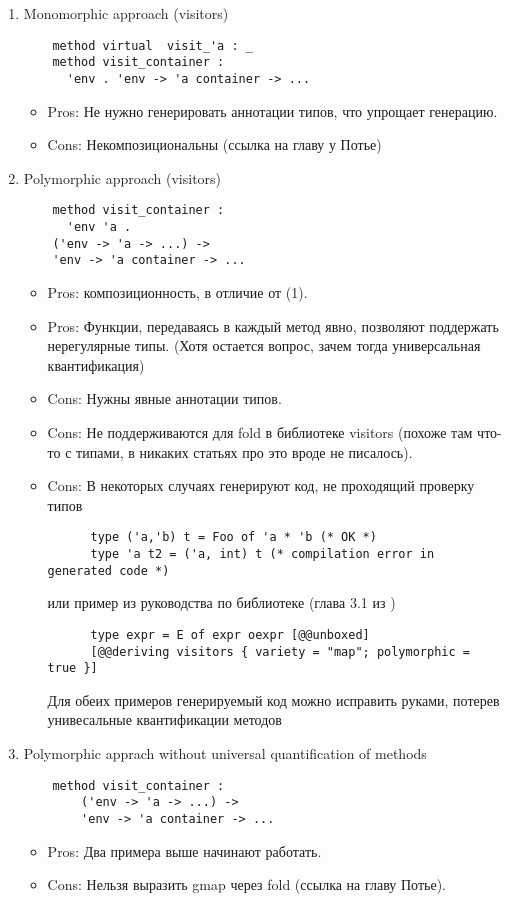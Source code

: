 \documentclass[acmsmall,review,anonymous]{acmart}\settopmatter{printfolios=true,printccs=false,printacmref=false}
\begin{document}
\begin{enumerate}

 \item Monomorphic approach (visitors)
    \begin{lstlisting}
    method virtual  visit_'a : _
    method visit_container :
      'env . 'env -> 'a container -> ...
    \end{lstlisting}
    \begin{itemize}
    \item Pros: Не нужно генерировать аннотации типов, что упрощает генерацию.
    \item Cons: Некомпозициональны (ссылка на главу у Потье)
    \end{itemize}
    
  \item Polymorphic approach (visitors)
    \begin{lstlisting}
    method visit_container :
      'env 'a .
	('env -> 'a -> ...) ->
	'env -> 'a container -> ...
    \end{lstlisting}
    \begin{itemize}
    \item Pros: композиционность,  в отличие от (1).
    \item Pros: Функции, передаваясь в каждый метод явно, позволяют поддержать нерегулярные типы. 
    (Хотя остается вопрос, зачем тогда универсальная квантификация)
    \item Cons: Нужны явные аннотации типов.
    \item Cons: Не поддерживаются для fold в библиотеке visitors (похоже там что-то с типами, в никаких статьях про это вроде не писалось).
    \item Cons: В некоторых случаях генерируют код, не проходящий проверку типов
	  \begin{lstlisting}
	  type ('a,'b) t = Foo of 'a * 'b (* OK *)
	  type 'a t2 = ('a, int) t (* compilation error in generated code *)
	  \end{lstlisting}
	  или пример из руководства по библиотеке (глава 3.1 из \cite{visitors_manual})
	  \begin{lstlisting}
	  type expr = E of expr oexpr [@@unboxed]
	  [@@deriving visitors { variety = "map"; polymorphic = true }]
	  \end{lstlisting}
	  Для обеих примеров генерируемый код можно исправить руками, потерев унивесальные квантификации методов
    \end{itemize}
  \item Polymorphic apprach without universal quantification of methods
      \begin{lstlisting}
	method visit_container :
	    ('env -> 'a -> ...) ->
	    'env -> 'a container -> ...
    \end{lstlisting}
    \begin{itemize}
    \item Pros: Два примера выше начинают работать.
    \item Cons: Нельзя выразить gmap через fold (ссылка на главу Потье).
    \end{itemize}
    

\end{enumerate}
\end{document}
